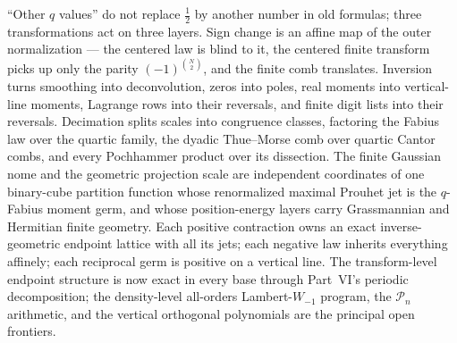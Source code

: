 \documentclass[11pt,oneside]{article}
\numberwithin{equation}{section}
\theoremstyle{definition}
\theoremstyle{remark}
\begin{document}
``Other $q$ values'' do not replace $\tfrac12$ by another number in old
formulas; three transformations act on three layers.  Sign change is an
affine map of the outer normalization --- the centered law is blind to it,
the centered finite transform picks up only the parity
$(-1)^{\binom N2}$, and the finite comb translates.  Inversion turns
smoothing into deconvolution, zeros into poles, real moments into
vertical-line moments, Lagrange rows into their reversals, and finite digit
lists into their reversals.  Decimation splits scales into congruence
classes, factoring the Fabius law over the quartic family, the dyadic
Thue--Morse comb over quartic Cantor combs, and every Pochhammer product over
its dissection.  The finite Gaussian nome and the geometric projection scale
are independent coordinates of one binary-cube partition function whose
renormalized maximal Prouhet jet is the $q$-Fabius moment germ, and whose
position-energy layers carry Grassmannian and Hermitian finite geometry.
Each positive contraction owns an exact inverse-geometric endpoint lattice
with all its jets; each negative law inherits everything affinely; each
reciprocal germ is positive on a vertical line.  The transform-level endpoint
structure is now exact in every base through Part~VI's periodic
decomposition; the density-level all-orders Lambert-$W_{-1}$ program, the
$\mathcal P_n$ arithmetic, and the vertical orthogonal polynomials are the
principal open frontiers.
\end{document}

